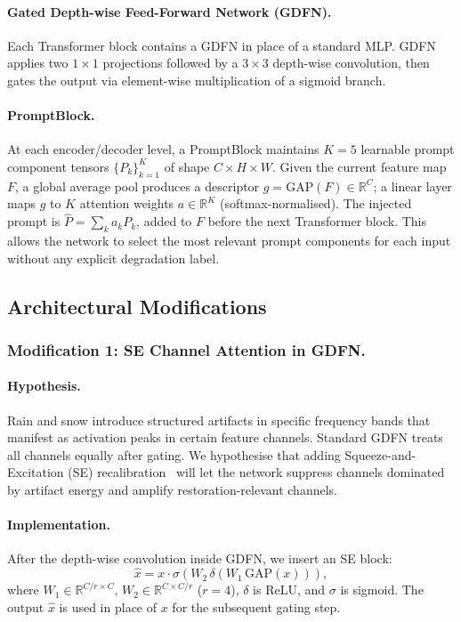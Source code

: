 \documentclass[runningheads]{llncs}
\begin{document}
\paragraph{Gated Depth-wise Feed-Forward Network (GDFN).}
Each Transformer block contains a GDFN in place of a standard MLP. GDFN
applies two $1\!\times\!1$ projections followed by a $3\!\times\!3$
depth-wise convolution, then gates the output via element-wise multiplication
of a sigmoid branch.

\paragraph{PromptBlock.}
At each encoder/decoder level, a PromptBlock maintains $K\!=\!5$ learnable
prompt component tensors $\{P_k\}_{k=1}^{K}$ of shape $C\!\times\!H\!\times\!W$.
Given the current feature map $F$, a global average pool produces a descriptor
$g = \mathrm{GAP}(F) \in \mathbb{R}^C$; a linear layer maps $g$ to $K$
attention weights $a \in \mathbb{R}^K$ (softmax-normalised). The injected
prompt is $\hat{P} = \sum_k a_k P_k$, added to $F$ before the next Transformer
block. This allows the network to select the most relevant prompt components
for each input without any explicit degradation label.

\subsection{Architectural Modifications}

\subsubsection{Modification 1: SE Channel Attention in GDFN.}

\paragraph{Hypothesis.}
Rain and snow introduce structured artifacts in specific frequency bands that
manifest as activation peaks in certain feature channels. Standard GDFN treats
all channels equally after gating. We hypothesise that adding
Squeeze-and-Excitation (SE) recalibration~\cite{hu2018squeeze} will let the
network suppress channels dominated by artifact energy and amplify
restoration-relevant channels.

\paragraph{Implementation.}
After the depth-wise convolution inside GDFN, we insert an SE block:
\begin{equation}
  \hat{x} = x \cdot \sigma\!\left(W_2\,\delta\!\left(W_1\,\mathrm{GAP}(x)\right)\right),
\end{equation}
where $W_1 \in \mathbb{R}^{C/r \times C}$, $W_2 \in \mathbb{R}^{C \times C/r}$
($r\!=\!4$), $\delta$ is ReLU, and $\sigma$ is sigmoid. The output $\hat{x}$ is
used in place of $x$ for the subsequent gating step.
\end{document}
